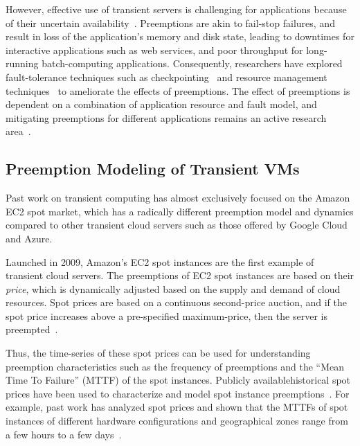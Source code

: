 However, effective use of transient servers is challenging for applications because of their uncertain availability~\cite{spotcheck, prateek-thesis}. 
Preemptions are akin to fail-stop failures, and result in loss of the application's memory and disk state, leading to downtimes for interactive applications such as web services, and poor throughput for long-running batch-computing applications. 
Consequently, researchers have explored fault-tolerance techniques such as checkpointing~\cite{flint, marathe2014exploiting, spoton} and resource management techniques~\cite{exosphere} to ameliorate the effects of preemptions. %
The effect of preemptions is dependent on a combination of application resource and fault model, and mitigating preemptions for different applications remains an active research area~\cite{hourglass-eurosys19}.




\vspace*{\subsecspace}
\subsection{Preemption Modeling of Transient VMs}


Past work on transient computing has almost exclusively focused on the Amazon EC2 spot market, which has a radically different preemption model and dynamics compared to other transient cloud servers such as those offered by Google Cloud and Azure. 

Launched in 2009, Amazon's EC2 spot instances are the first example of transient cloud servers.
The preemptions of EC2 spot instances are based on their \emph{price}, which is dynamically adjusted based on the supply and demand of cloud resources.
Spot prices are based on a continuous second-price auction, and if the spot price increases above a pre-specified maximum-price, then the server is preempted~\cite{spot-pricing2}.

Thus, the time-series of these spot prices can be used for understanding preemption characteristics such as the frequency of preemptions and the ``Mean Time To Failure'' (MTTF) of the spot instances. 
Publicly available\footnotemark historical spot prices have been used to characterize and model spot instance preemptions~\cite{spotcheck,bid-cloud}. %
For example, past work has analyzed spot prices and shown that the MTTFs of spot instances of different hardware configurations and geographical zones range from a few hours to a few days~\cite{prateek-thesis, wolski_probabilistic_2017, icdcs-spotlight}.

